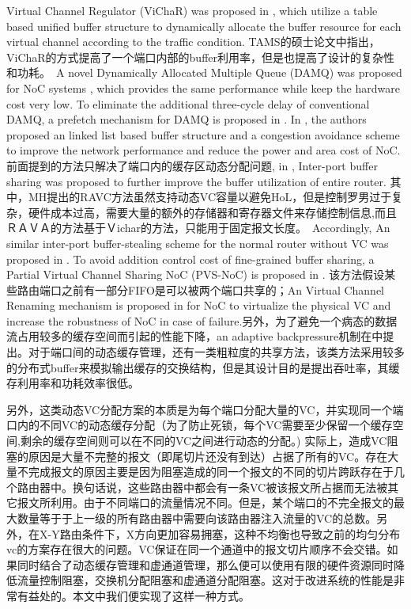 ﻿\documentclass[10pt,journal]{IEEEtran}
\begin{document}
Virtual Channel Regulator (ViChaR) was proposed in \cite{NPKV06}, which utilize a table based unified buffer structure to dynamically allocate the buffer resource for each virtual channel according to the traffic condition. TAMS的硕士论文中指出，ViChaR的方式提高了一个端口内部的buffer利用率，但是也提高了设计的复杂性和功耗。　A novel Dynamically Allocated Multiple Queue (DAMQ) was proposed for NoC systems \cite{liu2006shared}, which provides the same performance while keep the hardware cost very low. To eliminate the additional three-cycle delay of conventional DAMQ, a prefetch mechanism for DAMQ is proposed in \cite{6310960}. In \cite{4555894}, the authors proposed an linked list based buffer structure and a congestion avoidance scheme to improve the network performance and reduce the power and area cost of NoC.　前面提到的方法只解决了端口内的缓存区动态分配问题,  in \cite{Neishaburi:2009:RAN:1531542.1531658}\cite{5770788}, Inter-port buffer sharing was proposed to further improve the buffer utilization of entire router. 其中，MH提出的RAVC方法虽然支持动态VC容量以避免HoL，但是控制罗男过于复杂，硬件成本过高，需要大量的额外的存储器和寄存器文件来存储控制信息,而且ＲＡＶＡ的方法基于Ｖichar的方法，只能用于固定报文长度。　Accordingly, An similar inter-port buffer-stealing scheme for the normal router without VC was proposed in \cite{5722177}. To avoid addition control cost of fine-grained buffer sharing, a Partial Virtual Channel Sharing NoC (PVS-NoC) is proposed in \cite{5739053}. 该方法假设某些路由端口之前有一部分FIFO是可以被两个端口共享的；An Virtual Channel Renaming mechanism is proposed in \cite{6296442} for NoC to virtualize the physical VC and increase the robustness of NoC in case of failure.另外，为了避免一个病态的数据流占用较多的缓存空间而引起的性能下降，an adaptive backpressure机制在\cite{BeckerJMD12}中提出。对于端口间的动态缓存管理，还有一类粗粒度的共享方法，该类方法采用较多的分布式buffer来模拟输出缓存的交换结构\cite{Soteriou:2009:HDS:1591872.1591936}，但是其设计目的是提出吞吐率，其缓存利用率和功耗效率很低。

另外，这类动态VC分配方案的本质是为每个端口分配大量的VC，并实现同一个端口内的不同VC的动态缓存分配（为了防止死锁，每个VC需要至少保留一个缓存空间,剩余的缓存空间则可以在不同的VC之间进行动态的分配。) 实际上，造成VC阻塞的原因是大量不完整的报文（即尾切片还没有到达）占据了所有的VC。存在大量不完成报文的原因主要是因为阻塞造成的同一个报文的不同的切片跨跃存在于几个路由器中。换句话说，这些路由器中都会有一条VC被该报文所占据而无法被其它报文所利用。由于不同端口的流量情况不同。但是，某个端口的不完全报文的最大数量等于于上一级的所有路由器中需要向该路由器注入流量的VC的总数。另外，在X-Y路由条件下，X方向更加容易拥塞，这种不均衡也导致之前的均匀分布vc的方案存在很大的问题。VC保证在同一个通道中的报文切片顺序不会交错。如果同时结合了动态缓存管理和虚通道管理，那么便可以使用有限的硬件资源同时降低流量控制阻塞，交换机分配阻塞和虚通道分配阻塞。这对于改进系统的性能是非常有益处的。本文中我们便实现了这样一种方式。 
\end{document}
